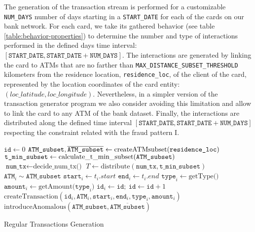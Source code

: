 The generation of the transaction stream is performed for a customizable \texttt{NUM\_DAYS} number of days starting in a \texttt{START\_DATE} for each of the cards on our bank network. For each card, we take its gathered behavior (see table \ref{table:behavior-properties}) to determine the number and type of interactions performed in the defined days time interval: $[\texttt{START\_DATE}, \texttt{START\_DATE} + \texttt{NUM\_DAYS}]$. The interactions are generated by linking the card to ATMs that are no farther than \texttt{MAX\_DISTANCE\_SUBSET\_THRESHOLD} kilometers from the residence location, \texttt{residence\_loc}, of the client of the card, represented by the location coordinates of the card entity: $(loc\_latitude, loc\_longitude)$. Nevertheless, in a simpler version of the transaction generator program we also consider avoiding this limitation and allow to link the card to any ATM of the bank dataset.
Finally, the interactions are distributed along the defined time interval $[\texttt{START\_DATE}, \texttt{START\_DATE} + \texttt{NUM\_DAYS}]$ respecting the constraint related with the fraud pattern I.

\begin{algorithm}[H]
  \small
  \begin{algorithmic}[1]
  \STATE $\texttt{id} \gets 0$
    \STATE $\texttt{ATM\_subset}, \overline{\texttt{ATM\_subset}} \gets \text{createATMsubset(\texttt{residence\_loc})}$
    \STATE $\texttt{t\_min\_subset} \gets \text{calculate\_t\_min\_subset(\texttt{ATM\_subset})}$
    \STATE $\texttt{num\_tx} \gets \text{decide\_num\_tx()}$
    \STATE $T \gets \text{distribute}(\texttt{num\_tx}, \texttt{t\_min\_subset})$
        \STATE $\texttt{ATM}_{i} \sim \texttt{ATM\_subset}$
        \STATE $\texttt{start}_{i} \gets t_i.start$
        \STATE $\texttt{end}_{i} \gets t_i.end$
        \STATE $\texttt{type}_{i} \gets \text{getType()}$
        \STATE $\texttt{amount}_{i} \gets \text{getAmount(}\texttt{type}_{i}\text{)}$
        \STATE $\texttt{id}_{i} \gets \texttt{id}; \ \texttt{id} \gets \texttt{id} + 1$
        \STATE $\text{createTransaction}(\texttt{id}_{i}, \texttt{ATM}_i, \texttt{start}_{i},\texttt{end}_{i}, \texttt{type}_{i}, \texttt{amount}_i)$
    \ENDFOR
    \STATE $\text{introduceAnomalous}(\texttt{ATM\_subset}, \overline{\texttt{ATM\_subset}})$ 
  \ENDFOR
  \end{algorithmic}
  \caption{Regular Transactions Generation}
  \label{alg:regular-tx-generator}
\end{algorithm}

